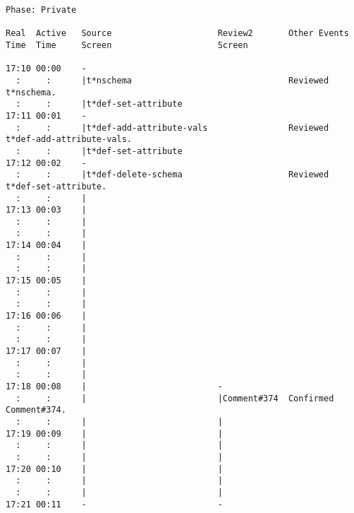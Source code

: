 \small
\begin{verbatim}
Phase: Private

Real  Active   Source                     Review2       Other Events
Time  Time     Screen                     Screen

17:10 00:00    -                                            
  :     :      |t*nschema                               Reviewed t*nschema. 
  :     :      |t*def-set-attribute                         
17:11 00:01    -                                            
  :     :      |t*def-add-attribute-vals                Reviewed t*def-add-attribute-vals. 
  :     :      |t*def-set-attribute                         
17:12 00:02    -                                            
  :     :      |t*def-delete-schema                     Reviewed t*def-set-attribute. 
  :     :      |                                            
17:13 00:03    |                                            
  :     :      |                                            
  :     :      |                                            
17:14 00:04    |                                            
  :     :      |                                            
  :     :      |                                            
17:15 00:05    |                                            
  :     :      |                                            
  :     :      |                                            
17:16 00:06    |                                            
  :     :      |                                            
  :     :      |                                            
17:17 00:07    |                                            
  :     :      |                                            
  :     :      |                                            
17:18 00:08    |                          -             
  :     :      |                          |Comment#374  Confirmed Comment#374. 
  :     :      |                          |             
17:19 00:09    |                          |             
  :     :      |                          |             
  :     :      |                          |             
17:20 00:10    |                          |             
  :     :      |                          |             
  :     :      |                          |             
17:21 00:11    -                          -             
\end{verbatim}
\normalsize